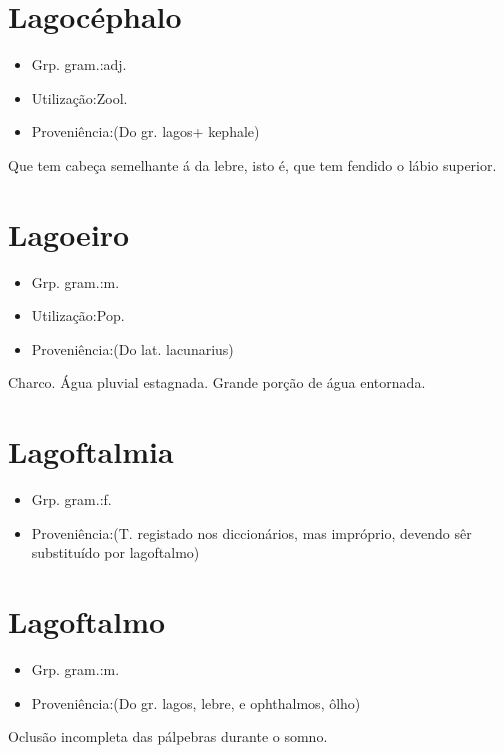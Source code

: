\section{Lagocéphalo}
\begin{itemize}
\item {Grp. gram.:adj.}
\end{itemize}
\begin{itemize}
\item {Utilização:Zool.}
\end{itemize}
\begin{itemize}
\item {Proveniência:(Do gr. \textunderscore lagos\textunderscore  + \textunderscore kephale\textunderscore )}
\end{itemize}
Que tem cabeça semelhante á da lebre, isto é, que tem fendido o lábio superior.
\section{Lagoeiro}
\begin{itemize}
\item {Grp. gram.:m.}
\end{itemize}
\begin{itemize}
\item {Utilização:Pop.}
\end{itemize}
\begin{itemize}
\item {Proveniência:(Do lat. \textunderscore lacunarius\textunderscore )}
\end{itemize}
Charco.
Água pluvial estagnada.
Grande porção de água entornada.
\section{Lagoftalmia}
\begin{itemize}
\item {Grp. gram.:f.}
\end{itemize}
\begin{itemize}
\item {Proveniência:(T. registado nos diccionários, mas impróprio, devendo sêr substituído por \textunderscore lagoftalmo\textunderscore )}
\end{itemize}

\section{Lagoftalmo}
\begin{itemize}
\item {Grp. gram.:m.}
\end{itemize}
\begin{itemize}
\item {Proveniência:(Do gr. \textunderscore lagos\textunderscore , lebre, e \textunderscore ophthalmos\textunderscore , ôlho)}
\end{itemize}
Oclusão incompleta das pálpebras durante o somno.

